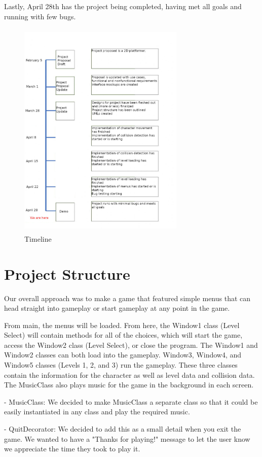 \documentclass[10pt,conference,onecolumn,compsoc]{IEEEtran}
\begin{document}
Lastly, April 28th has the project being completed, having met all goals and running with few bugs.
\begin{figure}[ht!]
\includegraphics[height=400px, width=300px]{Timeline.jpg}
\caption{Timeline}
\label{Timeline}
\end{figure}


\section{Project Structure}
Our overall approach was to make a game that featured simple menus that can head straight into gameplay or start gameplay at any point in the game.

From main, the menus will be loaded. From here, the Window1 class (Level Select) will contain methods for all of the choices, which will start the game, access the Window2 class (Level Select), or close the program. The Window1 and Window2 classes can both load into the gameplay. Window3, Window4, and Window5 classes (Levels 1, 2, and 3) run the gameplay. These three classes contain the information for the character as well as level data and collision data. The MusicClass also plays music for the game in the background in each screen.

- MusicClass: We decided to make MusicClass a separate class so that it could be easily instantiated in any class and play the required music.

- QuitDecorator: We decided to add this as a small detail when you exit the game. We wanted to have a "Thanks for playing!" message to let the user know we appreciate the time they took to play it.
\end{document}
